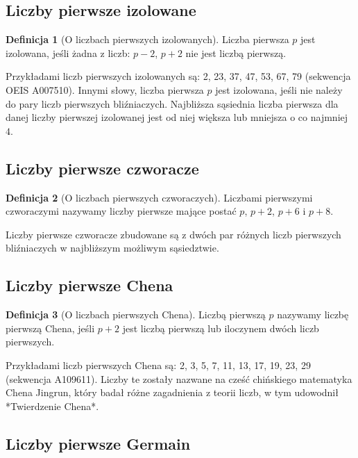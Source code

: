 \documentclass[10pt,onecolumn]{article}
\theoremstyle{definition}
\newtheorem{definition}{Definicja}
\theoremstyle{hypothesis}
\theoremstyle{capability}
\begin{document}
\subsection{Liczby pierwsze izolowane}

\begin{definition}[O liczbach pierwszych izolowanych]
Liczba pierwsza $p$ jest izolowana, jeśli żadna z liczb: $p-2$, $p+2$ nie jest liczbą pierwszą.
\end{definition}

Przykładami liczb pierwszych izolowanych są: 2, 23, 37, 47, 53, 67, 79 (sekwencja OEIS A007510). Innymi słowy, liczba pierwsza $p$ jest izolowana, jeśli nie należy do pary liczb pierwszych bliźniaczych. Najbliższa sąsiednia liczba pierwsza dla danej liczby pierwszej izolowanej jest od niej większa lub mniejsza o co najmniej $4$.

\subsection{Liczby pierwsze czworacze}

\begin{definition}[O liczbach pierwszych czworaczych]
Liczbami pierwszymi czworaczymi nazywamy liczby pierwsze mające postać $p$, $p+2$, $p+6$ i $p+8$.
\end{definition}

Liczby pierwsze czworacze zbudowane są z dwóch par różnych liczb pierwszych bliźniaczych w najbliższym możliwym sąsiedztwie.

\subsection{Liczby pierwsze Chena}

\begin{definition}[O liczbach pierwszych Chena]
Liczbą pierwszą $p$ nazywamy liczbę pierwszą Chena, jeśli $p+2$ jest liczbą pierwszą lub iloczynem dwóch liczb pierwszych.
\end{definition}

Przykładami liczb pierwszych Chena są: 2, 3, 5, 7, 11, 13, 17, 19, 23, 29 (sekwencja A109611). Liczby te zostały nazwane na cześć chińskiego matematyka Chena Jingrun, który badał różne zagadnienia z teorii liczb, w tym udowodnił *Twierdzenie Chena*.

\subsection{Liczby pierwsze Germain}
\end{document}
